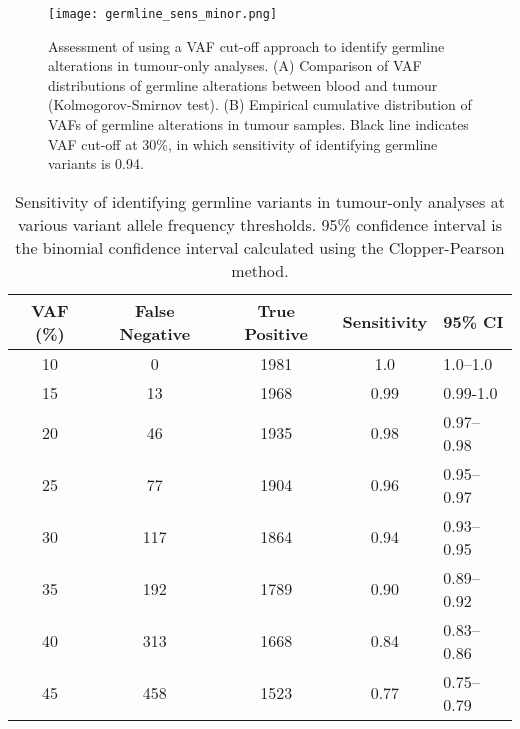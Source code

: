 
\begin{figure}[H]
	\texttt{[image: germline\_sens\_minor.png]}
	\caption[Assessment of using a VAF cut-off approach to identify germline alterations in tumour-only analyses.]{Assessment of using a VAF cut-off approach to identify germline alterations in tumour-only analyses. (A) Comparison of VAF distributions of germline alterations between blood and tumour (Kolmogorov-Smirnov test). (B) Empirical cumulative distribution of VAFs of germline alterations in tumour samples. Black line indicates VAF cut-off at 30\%, in which sensitivity of identifying germline variants is 0.94.}
	\label{fig:germline_sens_minor}
\end{figure}


\begin{table}[H]
\caption[Sensitivity of identifying germline variants in tumour-only analyses at various variant allele frequency thresholds.]{Sensitivity of identifying germline variants in tumour-only analyses at various variant allele frequency thresholds. 95\% confidence interval is the binomial confidence interval calculated using the Clopper-Pearson method.}
\label{tbl:sensitivity}
\centering
      \begin{tabular}{ccccl}
        \hline
        VAF (\%) & False Negative & True Positive & Sensitivity & 95\% CI
        \\
        \hline
        10 & 0 & 1981 & 1.0 & 1.0--1.0
        \\
        15 & 13 & 1968 & 0.99 & 0.99-1.0
        \\
        20 & 46 & 1935 & 0.98 & 0.97--0.98
        \\
        25 & 77 & 1904 & 0.96 & 0.95--0.97
        \\
        30 & 117 & 1864 & 0.94 & 0.93--0.95
        \\
        35 & 192 & 1789 & 0.90 & 0.89--0.92
        \\
        40 & 313 & 1668 & 0.84 & 0.83--0.86
        \\
        45 & 458 & 1523 & 0.77 & 0.75--0.79
        \\
				\hline
      \end{tabular} \\
\end{table}

